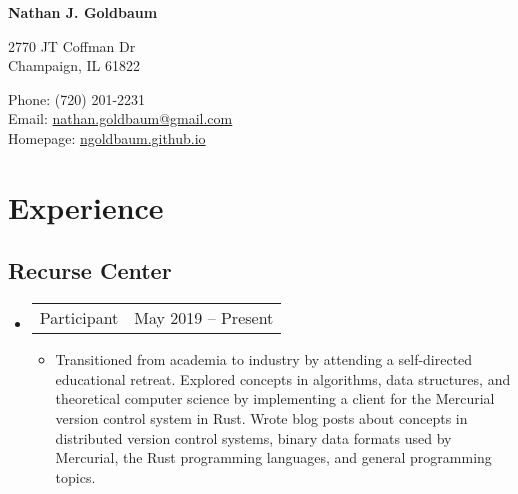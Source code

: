 \documentclass[10pt,letterpaper]{article}
\def\name{Nathan J. Goldbaum}
\newcommand{\textline}[2]{
  \begin{tabularx}{\textwidth}{XY}
  #1 & #2
  \end{tabularx}
}
\begin{document}
{\large \bf \name}


\bigskip

\begin{minipage}[t]{0.6\textwidth}
  2770 JT Coffman Dr \\
  Champaign, IL 61822
\end{minipage}
\begin{minipage}[t]{0.4\textwidth}
  Phone: (720) 201-2231 \\  %
  Email: \href{mailto:nathan.goldbaum@gmail.com}{nathan.goldbaum@gmail.com} \\
  Homepage: \href{ngoldbaum.github.io}{ngoldbaum.github.io}
\end{minipage}

\section*{Experience}

\subsection*{Recurse Center}
\begin{itemize}
  \item [] \textline{Participant}{May 2019 -- Present}
    \begin{itemize}
      \item [] Transitioned from academia to industry by attending a
        self-directed educational retreat. Explored concepts in algorithms, data
        structures, and theoretical computer science by implementing a client
        for the Mercurial version control system in Rust. Wrote blog posts about
        concepts in distributed version control systems, binary data formats
        used by Mercurial, the Rust programming languages, and general
        programming topics.
    \end{itemize}    
\end{itemize}
\end{document}

